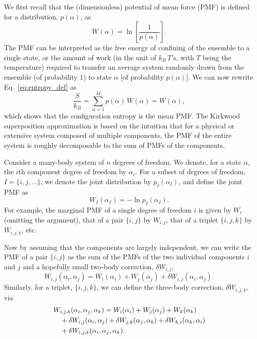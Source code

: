 \documentclass[preprint, superscriptaddress]{revtex4-1}
\begin{document}
We first recall that the (dimensionless) potential of mean force (PMF)
is defined for a distribution, $p(\alpha)$,
as
$$
W(\alpha) = \ln\left[ \frac{1}{p(\alpha)} \right].
$$
The PMF can be interpreted as
the free energy of confining of the ensemble to a single state,
or the amount of work
(in the unit of $k_B \, T$'s, with $T$ being the temperature)
required to transfer an average system randomly drawn from the ensemble (of probability $1$)
to state $\alpha$ [of probability $p(\alpha)$].
%
We can now rewrite Eq.~\eqref{eq:entropy_def} as
%
\begin{equation}
  \frac{S}{k_B}
  =
  \sum_{\alpha = 1}^M p(\alpha) \, W(\alpha)
  =
  \overline{ W(\alpha) }
  ,
  \label{eq:S_W}
\end{equation}
%
which shows that the configuration entropy
is the mean PMF.
%
The Kirkwood superposition approximation is based on the intuition
that for a physical or extensive system composed of multiple components,
the PMF of the entire system is roughly decomposable to the sum of PMFs of the components.

Consider a many-body system of $n$ degrees of freedom.
%
We denote, for a state $\alpha$, the $i$th component degree of freedom by $\alpha_i$.
%
%
For a subset of degrees of freedom, $I = \{i, j, \dots\}$,
we denote the joint distribution by $p_I(\alpha_I)$,
and define the joint PMF as
%
\begin{equation}
  W_I(\alpha_I) = -\ln p_I(\alpha_I)
  .
  \label{eq:WI_def}
\end{equation}
%
For example,
the marginal PMF of a single degree of freedom $i$ is given by $W_i$ (omitting the argument),
that of a pair $\{i, j\}$ by $W_{i, j}$,
that of a triplet $\{i, j, k\}$ by $W_{i, j, k}$, etc.

Now by assuming that the components are largely independent,
we can write the PMF of a pair $\{i, j\}$
as the sum of the PMFs of the two individual components $i$ and $j$
and a hopefully small two-body correction, $\delta W_{i,j}$,
%
\begin{equation}
  W_{i,j}(\alpha_i, \alpha_j)
  =
  W_i(\alpha_i) + W_j(\alpha_j)
  + \delta W_{i,j}(\alpha_i, \alpha_j)
  .
  \label{eq:W_ij}
\end{equation}
%
Similarly, for a triplet, $\{i, j, k\}$,
we can define the three-body correction, $\delta W_{i,j,k}$, via
%
\begin{align}
  &W_{i,j,k}(\alpha_i, \alpha_j, \alpha_k)
  =
  W_i(\alpha_i) + W_j(\alpha_j) + W_k(\alpha_k)
  \notag \\
  &\quad
  + \delta W_{i,j}(\alpha_i, \alpha_j)
  + \delta W_{j,k}(\alpha_j, \alpha_k)
  + \delta W_{k,i}(\alpha_k, \alpha_i)
  \notag \\
  &\quad
  + \delta W_{i,j,k}(\alpha_i, \alpha_j, \alpha_k)
  .
  \label{eq:W_ijk}
\end{align}
%
\end{document}
